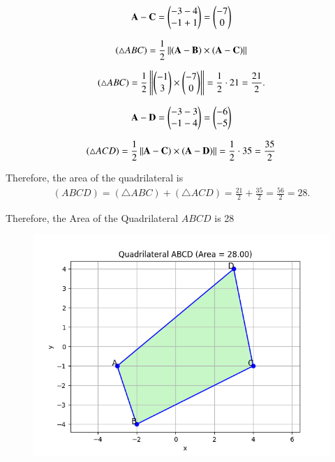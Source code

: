 \documentclass[journal]{IEEEtran}
\begin{document}
\begin{align}
\vec{A} - \vec{C} = \myvec{-3-4 \\ -1+1} = \myvec{-7 \\ 0}
\end{align}



\begin{align}
(\triangle ABC)=\frac{1}{2}\norm{(\vec{A}-\vec{B}) \times (\vec{A}-\vec{C})}
\end{align}

\begin{align}
(\triangle ABC)=\frac{1}{2}\norm{\myvec{-1 \\ 3} \times \myvec{-7 \\ 0}}=\frac{1}{2}\cdot 21=\frac{21}{2}.
\end{align}


\begin{align}
\vec{A}-\vec{D}
=\myvec{-3-3 \\ -1-4} = \myvec{-6 \\ -5}  
\end{align}





\begin{align}
(\triangle ACD)=\frac{1}{2}\norm{\vec{A}-\vec{C}) \times (\vec{A}-\vec{D})}=\frac12\cdot 35=\frac{35}{2}
\end{align}

Therefore, the area of the quadrilateral is
\begin{align}
(ABCD)=(\triangle ABC)+(\triangle ACD)
=\tfrac{21}{2}+\tfrac{35}{2}=\tfrac{56}{2}=28.
\end{align}

Therefore, the Area of the Quadrilateral $ABCD$ is 28




\begin{figure}[h!]
    \centering
    \includegraphics[height=0.5\textheight, keepaspectratio]{figs/Figure_1.png}
    \label{figure_1}
\end{figure}
\end{document}

